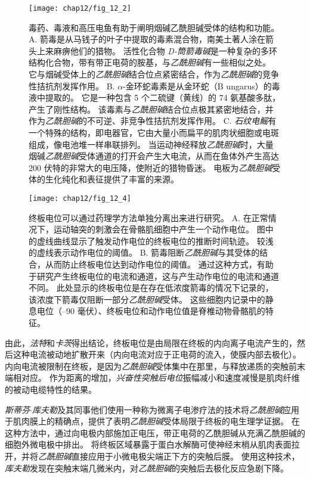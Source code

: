 \begin{figure}[htbp]
	\centering
	\texttt{[image: chap12/fig\_12\_2]}
	\caption{毒药、毒液和高压电鱼有助于阐明烟碱乙酰胆碱受体的结构和功能。 
	A. 箭毒是从马钱子的叶子中提取的毒素混合物，南美土著人涂在箭头上来麻痹他们的猎物。
	活性化合物 \textit{D-筒箭毒碱}是一种复杂的多环结构化合物，带有带正电荷的胺基，与\textit{乙酰胆碱}有一些相似之处。
	它与烟碱受体上的\textit{乙酰胆碱}结合位点紧密结合，作为\textit{乙酰胆碱}的竞争性拮抗剂发挥作用。
	B. $\alpha$-金环蛇毒素是从金环蛇（B ungarus）的毒液中提取的。
	它是一种包含 5 个二硫键（黄线）的 74 氨基酸多肽，产生了刚性结构。
	该毒素与\textit{乙酰胆碱}结合位点极其紧密地结合，并作为\textit{乙酰胆碱}的不可逆、非竞争性拮抗剂发挥作用。
	C. \textit{石纹电鳐}有一个特殊的结构，即电器官，它由大量小而扁平的肌肉状细胞或电斑组成，像电池堆一样串联排列。
	当运动神经释放\textit{乙酰胆碱}时，大量烟碱\textit{乙酰胆碱}受体通道的打开会产生大电流，从而在鱼体外产生高达 200 伏特的非常大的电压降，使附近的猎物昏迷。
	电板为\textit{乙酰胆碱}受体的生化纯化和表征提供了丰富的来源。}
	\label{fig:12_2}
\end{figure}


\begin{figure}[htbp]
	\centering
	\texttt{[image: chap12/fig\_12\_4]}
	\caption{终板电位可以通过药理学方法单独分离出来进行研究。
		A. 在正常情况下，运动轴突的刺激会在骨骼肌细胞中产生一个动作电位。
		图中的虚线曲线显示了触发动作电位的终板电位的推断时间轨迹。
		较浅的虚线表示动作电位的阈值。
		B. 箭毒阻断\textit{乙酰胆碱}与其受体的结合，从而防止终板电位达到动作电位的阈值。
		通过这种方式，有助于研究产生终板电位的电流和通道，这与产生动作电位的电流和通道不同。
		此处显示的终板电位是在存在低浓度箭毒的情况下记录的，该浓度下箭毒仅阻断一部分\textit{乙酰胆碱}受体。
		这些细胞内记录中的静息电位（–90 毫伏）、终板电位和动作电位值是脊椎动物骨骼肌的特征。}
	\label{fig:12_4}
\end{figure}


由此，\textit{法特}和\textit{卡茨}得出结论，终板电位是由局限在终板的内向离子电流产生的，然后这种电流被动地扩散开来（内向电流对应于正电荷的流入，使膜内部去极化）。
内向电流被限制在终板，是因为\textit{乙酰胆碱}受体集中在那里，与释放递质的突触前末端相对应。
作为距离的增加，\textit{兴奋性突触后电位}振幅减小和速度减慢是肌肉纤维的被动电缆特性的结果。


\textit{斯蒂芬$\cdot$库夫勒}及其同事他们使用一种称为微离子电渗疗法的技术将\textit{乙酰胆碱}应用于肌肉膜上的精确点，提供了表明\textit{乙酰胆碱}受体局限于终板的电生理学证据。
在这种方法中，通过向电极内部施加正电压，带正电荷的乙酰胆碱从充满乙酰胆碱的细胞外微电极中排出。
将终板区域暴露于蛋白水解酶可使神经末梢从肌肉表面拉开，并将\textit{乙酰胆碱}直接应用于小微电极尖端正下方的突触后膜。
使用这种技术，\textit{库夫勒}发现在突触末端几微米内，对\textit{乙酰胆碱}的突触后去极化反应急剧下降。


